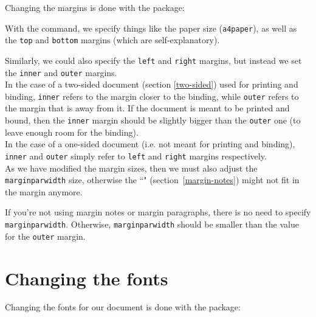 Changing the margins is done with the  package:

 

With the  command, we specify things like the paper size (\texttt{a4paper}), as well as the \texttt{top} and \texttt{bottom} margins (which are self-explanatory).

Similarly, we could also specify the \texttt{left} and \texttt{right} margins, but instead we set the \texttt{inner} and \texttt{outer} margins. \\

In the case of a two-sided document (section \ref{two-sided}) used for printing and binding, \texttt{inner} refers to the margin closer to the binding, while \texttt{outer} refers to the margin that is away from it. If the document is meant to be printed and bound, then the \texttt{inner} margin should be slightly bigger than the \texttt{outer} one (to leave enough room for the binding). \\

In the case of a one-sided document (i.e. not meant for printing and binding), \texttt{inner} and \texttt{outer} simply refer to \texttt{left} and \texttt{right} margins respectively. \\

As we have modified the margin sizes, then we must also adjust the \\
\texttt{marginparwidth} size, otherwise the ``" (section~\ref{margin-notes}) might not fit in the margin anymore.

If you're not using margin notes or margin paragraphs, there is no need to specify \texttt{marginparwidth}. Otherwise, \texttt{marginparwidth} should be smaller than the value for the \texttt{outer} margin. \\



\section{Changing the fonts} \label{changing-the-fonts}


Changing the fonts for our document is done with the  package:



\medskip

